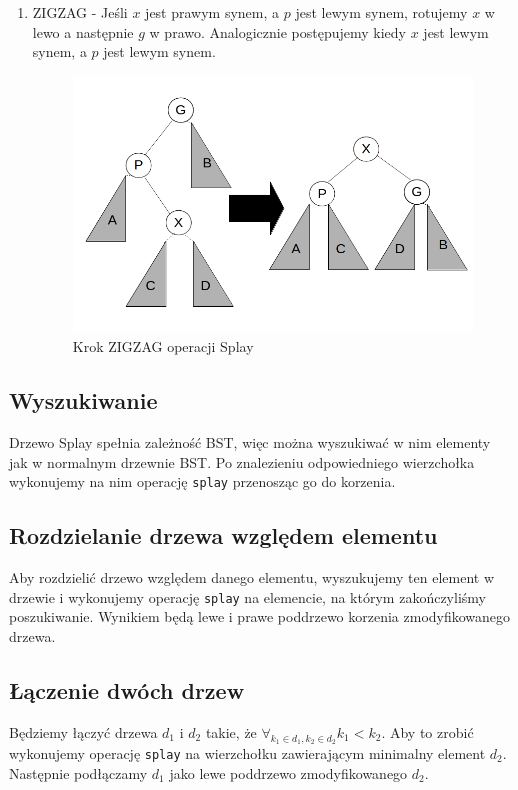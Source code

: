 \documentclass[declaration,shortabstract]{iithesis}
\theoremstyle{thm}
\theoremstyle{remark}
\theoremstyle{plain}
\theoremstyle{plain}
\theoremstyle{plain}
\begin{document}
\begin{enumerate}
\item{ZIGZAG - Jeśli $x$ jest prawym synem, a $p$ jest lewym synem, rotujemy $x$ w lewo a następnie $g$ w prawo. Analogicznie postępujemy kiedy $x$  jest lewym synem, a $p$ jest lewym synem.\\ 
\begin{figure}[H] 
\centering    
\includegraphics[scale = 0.3]{zigzag.png}  
\caption{Krok ZIGZAG operacji Splay}  
\label{fig:zigzag} 
\end{figure}} 
\end{enumerate}    

\subsection{Wyszukiwanie}
Drzewo Splay spełnia zależność BST, więc można wyszukiwać w nim elementy jak w normalnym drzewnie BST. Po znalezieniu odpowiedniego wierzchołka wykonujemy na nim operację \texttt{splay} przenosząc go do korzenia.  

\subsection{Rozdzielanie drzewa względem elementu} 
Aby rozdzielić drzewo względem danego elementu, wyszukujemy ten element w drzewie i wykonujemy operację \texttt{splay} na elemencie, na którym zakończyliśmy poszukiwanie. Wynikiem będą lewe i prawe poddrzewo korzenia zmodyfikowanego drzewa.  

\subsection{Łączenie dwóch drzew} 
Będziemy łączyć drzewa \(d_1\) i \( d_2\) takie, że \(\forall_{k_1 \in d_1, k_2 \in d_2} k_1 < k_2\). Aby to zrobić wykonujemy operację \texttt{splay} na wierzchołku zawierającym minimalny element \(d_2\). Następnie podłączamy \(d_1\) jako lewe poddrzewo zmodyfikowanego \(d_2\).  
\end{document}
